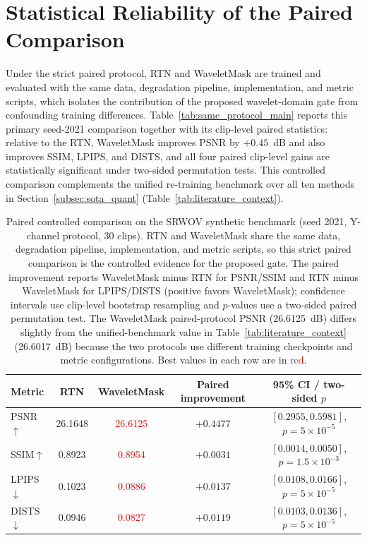 \documentclass[applsci,article,submit,pdftex,moreauthors]{Definitions/mdpi}
\begin{document}
\appendixstart
\appendix
\section{Statistical Reliability of the Paired Comparison}\label{app:stats}

Under the strict paired protocol, RTN and WaveletMask are trained and evaluated with the same data, degradation pipeline, implementation, and metric scripts, which isolates the contribution of the proposed wavelet-domain gate from confounding training differences. Table~\ref{tab:same_protocol_main} reports this primary seed-2021 comparison together with its clip-level paired statistics: relative to the RTN, WaveletMask improves PSNR by $+0.45$~dB and also improves SSIM, LPIPS, and DISTS, and all four paired clip-level gains are statistically significant under two-sided permutation tests. This controlled comparison complements the unified re-training benchmark over all ten methods in Section~\ref{subsec:sota_quant} (Table~\ref{tab:literature_context}).

\begin{table}[t]
\caption{Paired controlled comparison on the SRWOV synthetic benchmark (seed 2021, Y-channel protocol, 30 clips). RTN and WaveletMask share the same data, degradation pipeline, implementation, and metric scripts, so this strict paired comparison is the controlled evidence for the proposed gate. The paired improvement reports WaveletMask minus RTN for PSNR/SSIM and RTN minus WaveletMask for LPIPS/DISTS (positive favors WaveletMask); confidence intervals use clip-level bootstrap resampling and $p$-values use a two-sided paired permutation test. The WaveletMask paired-protocol PSNR (26.6125~dB) differs slightly from the unified-benchmark value in Table~\ref{tab:literature_context} (26.6017~dB) because the two protocols use different training checkpoints and metric configurations. Best values in each row are in \textcolor{red}{red}.\label{tab:same_protocol_main}\label{tab:paired_seed2021_stats}}
\footnotesize
\begin{tabularx}{\textwidth}{lCCCC}
\toprule
\textbf{Metric} & \textbf{RTN} & \textbf{WaveletMask} & \textbf{Paired improvement} & \textbf{95\% CI / two-sided $p$} \\
\midrule
PSNR$\uparrow$  & 26.1648 & \textcolor{red}{26.6125} & $+0.4477$ & $[0.2955, 0.5981]$, $p=5\times10^{-5}$ \\
SSIM$\uparrow$  & 0.8923  & \textcolor{red}{0.8954}  & $+0.0031$ & $[0.0014, 0.0050]$, $p=1.5\times10^{-3}$ \\
LPIPS$\downarrow$ & 0.1023 & \textcolor{red}{0.0886} & $+0.0137$ & $[0.0108, 0.0166]$, $p=5\times10^{-5}$ \\
DISTS$\downarrow$ & 0.0946 & \textcolor{red}{0.0827} & $+0.0119$ & $[0.0103, 0.0136]$, $p=5\times10^{-5}$ \\
\bottomrule
\end{tabularx}
\normalsize
\end{table}
\end{document}
